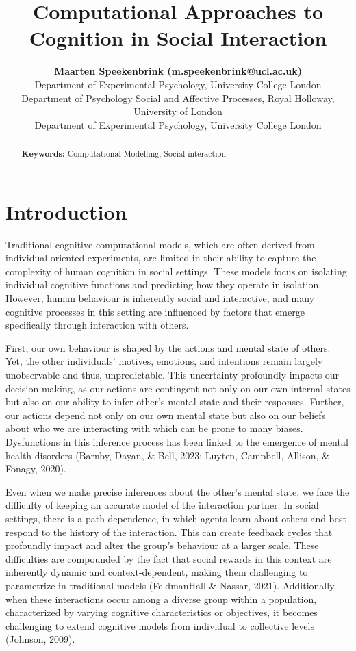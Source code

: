 \documentclass[10pt, letterpaper]{article}
\title{Computational Approaches to Cognition in Social Interaction}
\author{{\large \bf Maarten Speekenbrink (m.speekenbrink@ucl.ac.uk)} \\ Department of Experimental Psychology, University College London  \AND {\large \bf Joseph M Barnby (Joseph.Barnby@rhul.ac.uk} \\  Department of Psychology Social and Affective Processes, Royal Holloway, University of London \AND {\large \bf Ismail Guennouni (i.guennouni.17@ucl.ac.uk)} \\ Department of Experimental Psychology, University College London }
\begin{document}
\maketitle

\begin{abstract}


\textbf{Keywords:}
Computational Modelling; Social interaction
\end{abstract}

\hypertarget{introduction}{%
\section{Introduction}\label{introduction}}

Traditional cognitive computational models, which are often derived from
individual-oriented experiments, are limited in their ability to capture
the complexity of human cognition in social settings. These models focus
on isolating individual cognitive functions and predicting how they
operate in isolation. However, human behaviour is inherently social and
interactive, and many cognitive processes in this setting are influenced
by factors that emerge specifically through interaction with others.

First, our own behaviour is shaped by the actions and mental state of
others. Yet, the other individuals' motives, emotions, and intentions
remain largely unobservable and thus, unpredictable. This uncertainty
profoundly impacts our decision-making, as our actions are contingent
not only on our own internal states but also on our ability to infer
other's mental state and their responses. Further, our actions depend
not only on our own mental state but also on our beliefs about who we
are interacting with which can be prone to many biases. Dysfunctions in
this inference process has been linked to the emergence of mental health
disorders (Barnby, Dayan, \& Bell, 2023; Luyten, Campbell, Allison, \&
Fonagy, 2020).

Even when we make precise inferences about the other's mental state, we
face the difficulty of keeping an accurate model of the interaction
partner. In social settings, there is a path dependence, in which agents
learn about others and best respond to the history of the interaction.
This can create feedback cycles that profoundly impact and alter the
group's behaviour at a larger scale. These difficulties are compounded
by the fact that social rewards in this context are inherently dynamic
and context-dependent, making them challenging to parametrize in
traditional models (FeldmanHall \& Nassar, 2021). Additionally, when
these interactions occur among a diverse group within a population,
characterized by varying cognitive characteristics or objectives, it
becomes challenging to extend cognitive models from individual to
collective levels (Johnson, 2009).
\end{document}

